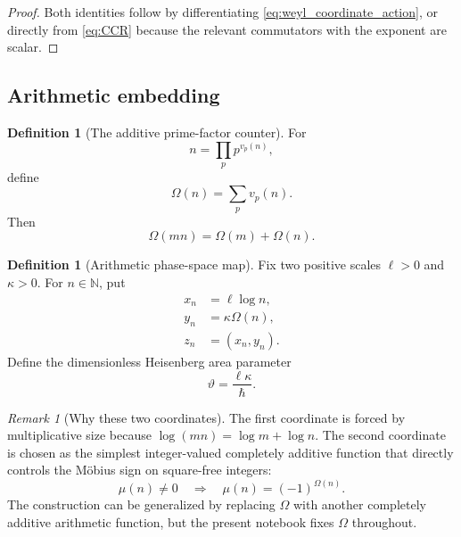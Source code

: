 \documentclass[11pt]{amsart}
\numberwithin{equation}{section}
\theoremstyle{plain}
\theoremstyle{definition}
\newtheorem{definition}[theorem]{Definition}
\theoremstyle{remark}
\newtheorem{remark}[theorem]{Remark}
\newcommand{\N}{\mathbb{N}}
\newcommand{\Om}{\Omega}
\begin{document}
\begin{proof}
Both identities follow by differentiating \eqref{eq:weyl_coordinate_action},
or directly from \eqref{eq:CCR} because the relevant commutators with the
exponent are scalar.
\end{proof}

\subsection{Arithmetic embedding}
\label{subsec:arithmetic_embedding}

\begin{definition}[The additive prime-factor counter]
\label{def:Omega}
For
\begin{equation}
n=\prod_p p^{v_p(n)},
\label{eq:prime_factorization}
\end{equation}
define
\begin{equation}
\Om(n)=\sum_p v_p(n).
\label{eq:Omega_definition}
\end{equation}
Then
\begin{equation}
\Om(mn)=\Om(m)+\Om(n).
\label{eq:Omega_additivity}
\end{equation}
\end{definition}

\begin{definition}[Arithmetic phase-space map]
\label{def:arithmetic_phase_space_map}
Fix two positive scales $\ell>0$ and $\kappa>0$.  For $n\in\N$, put
\begin{align}
x_n
&=\ell\log n,
\label{eq:xn_definition}\\
y_n
&=\kappa\Om(n),
\label{eq:yn_definition}\\
z_n
&=(x_n,y_n).
\label{eq:zn_definition}
\end{align}
Define the dimensionless Heisenberg area parameter
\begin{equation}
\vartheta=\frac{\ell\kappa}{\hbar}.
\label{eq:theta_definition}
\end{equation}
\end{definition}

\begin{remark}[Why these two coordinates]
\label{rem:why_coordinates}
The first coordinate is forced by multiplicative size because
$\log(mn)=\log m+\log n$.  The second coordinate is chosen as the simplest
integer-valued completely additive function that directly controls the
M\"obius sign on square-free integers:
\begin{equation}
\mu(n)\neq0
\quad\Longrightarrow\quad
\mu(n)=(-1)^{\Om(n)}.
\label{eq:mobius_Omega_relation}
\end{equation}
The construction can be generalized by replacing $\Om$ with another
completely additive arithmetic function, but the present notebook fixes $\Om$ throughout.
\end{remark}
\end{document}
